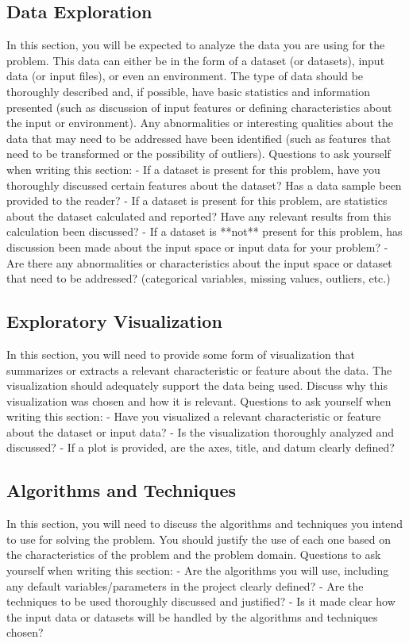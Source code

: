 \documentclass[12pt]{article}
\begin{document}
\subsection{Data Exploration}
In this section, you will be expected to analyze the data you are using for the problem. This data can either be in the form of a dataset (or datasets), input data (or input files), or even an environment. The type of data should be thoroughly described and, if possible, have basic statistics and information presented (such as discussion of input features or defining characteristics about the input or environment). Any abnormalities or interesting qualities about the data that may need to be addressed have been identified (such as features that need to be transformed or the possibility of outliers). Questions to ask yourself when writing this section:
- If a dataset is present for this problem, have you thoroughly discussed certain features about the dataset? Has a data sample been provided to the reader?
- If a dataset is present for this problem, are statistics about the dataset calculated and reported? Have any relevant results from this calculation been discussed?
- If a dataset is **not** present for this problem, has discussion been made about the input space or input data for your problem?
- Are there any abnormalities or characteristics about the input space or dataset that need to be addressed? (categorical variables, missing values, outliers, etc.)

\subsection{Exploratory Visualization}
In this section, you will need to provide some form of visualization that summarizes or extracts a relevant characteristic or feature about the data. The visualization should adequately support the data being used. Discuss why this visualization was chosen and how it is relevant. Questions to ask yourself when writing this section:
- Have you visualized a relevant characteristic or feature about the dataset or input data?
- Is the visualization thoroughly analyzed and discussed?
- If a plot is provided, are the axes, title, and datum clearly defined?

\subsection{Algorithms and Techniques}
In this section, you will need to discuss the algorithms and techniques you intend to use for solving the problem. You should justify the use of each one based on the characteristics of the problem and the problem domain. Questions to ask yourself when writing this section:
- Are the algorithms you will use, including any default variables/parameters in the project clearly defined?
- Are the techniques to be used thoroughly discussed and justified?
- Is it made clear how the input data or datasets will be handled by the algorithms and techniques chosen?
\end{document}
